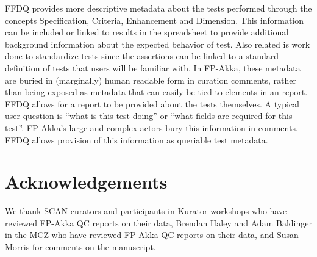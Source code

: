 \documentclass{article}
\begin{document}
FFDQ provides more descriptive metadata about the tests performed through the concepts Specification, Criteria, Enhancement and Dimension. This information can be included or linked to results in the spreadsheet to provide additional background information about the expected behavior of test. Also related is work done to standardize tests since the  assertions can be linked to a standard definition of tests that users will be familiar with.
In FP-Akka, these metadata are buried in (marginally) human readable form in curation comments, rather than being exposed as metadata that can easily be tied to elements in an report.  FFDQ allows for a report to be provided about the tests themselves.  A typical user question is ``what is this test doing'' or ``what fields are required for this test''.  FP-Akka's large and complex actors bury this information in comments.  FFDQ allows provision of this information as queriable test metadata.

\section{Acknowledgements}
We thank SCAN curators and participants in Kurator workshops who have reviewed FP-Akka QC reports on their data,   
Brendan Haley and Adam Baldinger in the MCZ who have reviewed FP-Akka QC reports on their data, and
Susan Morris for comments on the manuscript.



\newpage
{}
\end{document}
